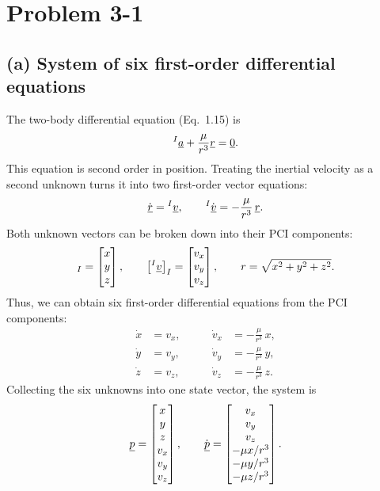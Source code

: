 \section{Problem 3-1}
\label{sec:problem1}

\subsection*{(a) System of six first-order differential equations}

The two-body differential equation (Eq.~1.15) is
\begin{equation}
    {}^{I}\underline{a} + \frac{\mu}{r^3}\underline{r} = \underline{0}.
\end{equation}
This equation is second order in position. Treating the inertial velocity as a second unknown turns it into two first-order vector equations:
\begin{equation}
    \dot{\underline{r}} = {}^{I}\underline{v}, \qquad
    {}^{I}\dot{\underline{v}} = -\frac{\mu}{r^3}\,\underline{r}.
    \label{eq:p1-firstorder}
\end{equation}
Both unknown vectors can be broken down into their PCI components:
\begin{equation}
    [\vect{r}]_I = \begin{bmatrix} x \\ y \\ z \end{bmatrix}, \qquad
    \big[\ivect{v}\big]_I = \begin{bmatrix} v_x \\ v_y \\ v_z \end{bmatrix}, \qquad
    r = \sqrt{x^2 + y^2 + z^2}.
\end{equation}
Thus, we can obtain six first-order differential equations from the PCI components:
\begin{equation}
    \begin{aligned}
        \dot{x}  &= v_x, &\qquad \dot{v}_x &= -\frac{\mu}{r^3}\,x, \\
        \dot{y}  &= v_y, &\qquad \dot{v}_y &= -\frac{\mu}{r^3}\,y, \\
        \dot{z}  &= v_z, &\qquad \dot{v}_z &= -\frac{\mu}{r^3}\,z.
    \end{aligned}
\end{equation}
Collecting the six unknowns into one state vector, the system is
\begin{equation}
    \underline{p} = \begin{bmatrix} x \\ y \\ z \\ v_x \\ v_y \\ v_z \end{bmatrix}, \qquad
    \dot{\underline{p}} = \begin{bmatrix} v_x \\ v_y \\ v_z \\ -\mu x / r^3 \\ -\mu y / r^3 \\ -\mu z / r^3 \end{bmatrix}.
    \label{eq:p1-pdot}
\end{equation} 

